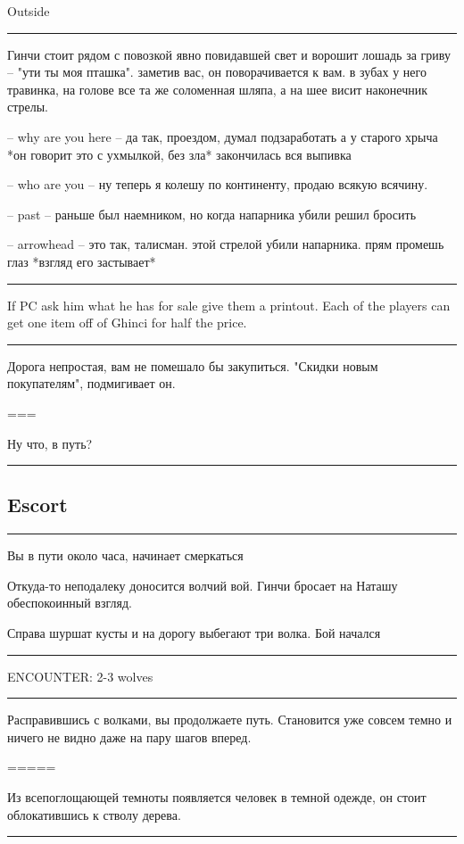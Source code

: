 \documentclass[a5paper,11pt]{book}
\newenvironment{boxed}
{\em\noindent\rule[1ex]{\linewidth}{0.1pt}\linebreak\indent}
{\par\noindent\rule[1ex]{\linewidth}{0.1pt}}
\begin{document}
\begin{multicols}{2}
Outside

\begin{boxed}
Гинчи стоит рядом с повозкой явно повидавшей свет и ворошит лошадь за гриву -- "ути ты моя пташка". заметив вас, он поворачивается к вам. в зубах у него травинка, на голове все та же соломенная шляпа, а на шее висит наконечник стрелы.

-- why are you here -- да так, проездом, думал подзаработать а у старого хрыча *он говорит это с ухмылкой, без зла* закончилась вся выпивка

-- who are you -- ну теперь я колешу по континенту, продаю всякую всячину.

-- past -- раньше был наемником, но когда напарника убили решил бросить

-- arrowhead -- это так, талисман. этой стрелой убили напарника. прям промешь глаз *взгляд его застывает*
\end{boxed}

If PC ask him what he has for sale give them a printout. Each of the players can get one item off of Ghinci for half the price.

\begin{boxed}
Дорога непростая, вам не помешало бы закупиться. "Скидки новым покупателям", подмигивает он.

===

Ну что, в путь?
\end{boxed}

\subsection{Escort}

\begin{boxed}
Вы в пути около часа, начинает смеркаться

Откуда-то неподалеку доносится волчий вой. Гинчи бросает на Наташу обеспокоинный взгляд.

Справа шуршат кусты и на дорогу выбегают три волка. Бой начался
\end{boxed}

ENCOUNTER: 2-3 wolves

\begin{boxed}
Расправившись с волками, вы продолжаете путь. Становится уже совсем темно и ничего не видно даже на пару шагов вперед.

=====

Из всепоглощающей темноты появляется человек в темной одежде, он стоит облокатившись к стволу дерева.


\end{boxed}
\end{multicols}
\end{document}
